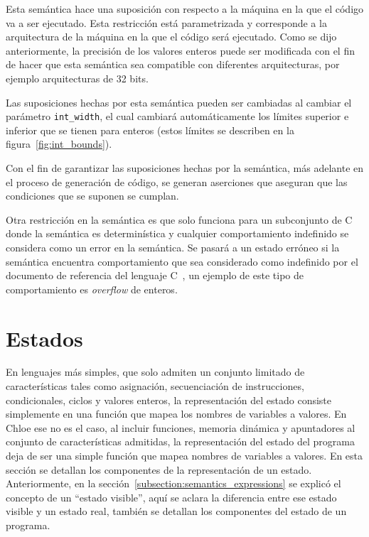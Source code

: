 Esta semántica hace una suposición con respecto a la máquina en la que el código va a ser ejecutado.
Esta restricción está parametrizada y corresponde a la arquitectura de la máquina en la que el código será ejecutado.
Como se dijo anteriormente, la precisión de los valores enteros puede ser modificada con el fin de hacer que esta semántica sea compatible con diferentes arquitecturas, por ejemplo arquitecturas de 32 bits.

Las suposiciones hechas por esta semántica pueden ser cambiadas al cambiar el parámetro \verb|int_width|, el cual cambiará automáticamente los límites superior e inferior que se tienen para enteros (estos límites se describen en la figura~\ref{fig:int_bounds}).

Con el fin de garantizar las suposiciones hechas por la semántica, más adelante en el proceso de generación de código, se generan aserciones que aseguran que las condiciones que se suponen se cumplan.

Otra restricción en la semántica es que solo funciona para un subconjunto de C donde la semántica es determinística y cualquier comportamiento indefinido se considera como un error en la semántica.
Se pasará a un estado erróneo si la semántica encuentra comportamiento que sea considerado como indefinido por el documento de referencia del lenguaje C~\citep{c99}, un ejemplo de este tipo de comportamiento es \textit{overflow} de enteros.


\section{Estados}\label{section:states}

En lenguajes más simples, que solo admiten un conjunto limitado de características tales como asignación, secuenciación de instrucciones, condicionales, ciclos y valores enteros, la representación del estado consiste simplemente en una función que mapea los nombres de variables a valores.
En Chloe ese no es el caso, al incluir funciones, memoria dinámica y apuntadores al conjunto de características admitidas, la representación del estado del programa deja de ser una simple función que mapea nombres de variables a valores.
En esta sección se detallan los componentes de la representación de un estado.
Anteriormente, en la sección~\ref{subsection:semantics_expressions} se explicó el concepto de un ``estado visible'', aquí se aclara la diferencia entre ese estado visible y un estado real, también se detallan los componentes del estado de un programa.

